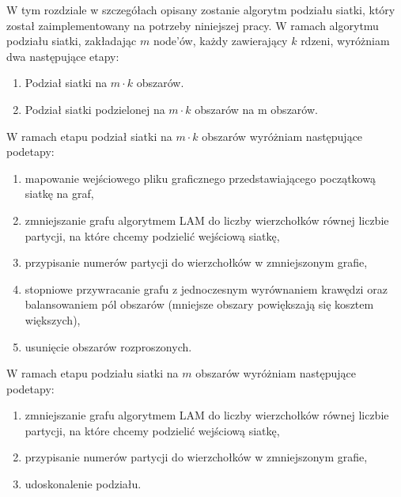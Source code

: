 W tym rozdziale w szczegółach opisany zostanie algorytm podziału siatki, który został zaimplementowany na potrzeby
niniejszej pracy.
W ramach algorytmu podziału siatki, zakładając $m$ node'ów, każdy zawierający $k$ rdzeni, wyróżniam dwa następujące etapy:

\begin{enumerate}
    \item Podział siatki na $m \cdot k$ obszarów.
    \item Podział siatki podzielonej na $m \cdot k$ obszarów na m obszarów.
\end{enumerate}

W ramach etapu podział siatki na $m \cdot k$ obszarów wyróżniam następujące podetapy:
        {\begin{enumerate}
             \item {mapowanie wejściowego pliku graficznego przedstawiającego początkową siatkę na graf,}
             \item {zmniejszanie grafu algorytmem LAM \cite{weighted_maching} do liczby wierzchołków równej liczbie partycji,
                 na które chcemy podzielić wejściową siatkę,}
             \item {przypisanie numerów partycji do wierzchołków w zmniejszonym grafie,}
             \item {stopniowe przywracanie grafu z jednoczesnym wyrównaniem krawędzi \cite{10.1007/3-540-44842-X_6} oraz balansowaniem pól obszarów (mniejsze
             obszary powiększają się kosztem większych),}
             \item {usunięcie obszarów rozproszonych.}
\end{enumerate}}

W ramach etapu podziału siatki na $m$ obszarów wyróżniam następujące podetapy:
\begin{enumerate}
    \item {zmniejszanie grafu algorytmem LAM \cite{weighted_maching} do liczby wierzchołków równej liczbie partycji,
        na które chcemy podzielić wejściową siatkę,}
    \item {przypisanie numerów partycji do wierzchołków w zmniejszonym grafie,}
    \item {udoskonalenie podziału.}
\end{enumerate}